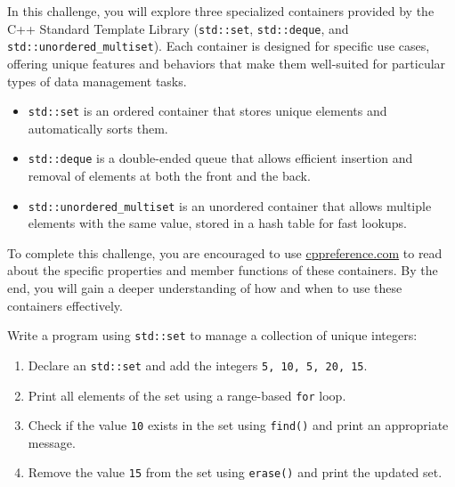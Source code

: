 \begin{challenge}
    \begin{chadescription}
    In this challenge, you will explore three specialized containers provided by the C++ Standard Template Library (\texttt{std::set}, \texttt{std::deque}, and \texttt{std::unordered\_multiset}). 
    Each container is designed for specific use cases, offering unique features and behaviors that make them well-suited for particular types of data management tasks.

    \begin{itemize}
        \item \texttt{std::set} is an ordered container that stores unique elements and automatically sorts them.
        \item \texttt{std::deque} is a double-ended queue that allows efficient insertion and removal of elements at both the front and the back.
        \item \texttt{std::unordered\_multiset} is an unordered container that allows multiple elements with the same value, stored in a hash table for fast lookups.
    \end{itemize}

    To complete this challenge, you are encouraged to use \href{https://en.cppreference.com/}{cppreference.com} to read about the specific properties and member functions of these containers. 
    By the end, you will gain a deeper understanding of how and when to use these containers effectively.
    \end{chadescription}

    \begin{task}
        Write a program using \texttt{std::set} to manage a collection of unique integers:
        \begin{enumerate}
            \item Declare an \texttt{std::set} and add the integers \texttt{5, 10, 5, 20, 15}.
            \item Print all elements of the set using a range-based \texttt{for} loop.
            \item Check if the value \texttt{10} exists in the set using \texttt{find()} and print an appropriate message.
            \item Remove the value \texttt{15} from the set using \texttt{erase()} and print the updated set.
        \end{enumerate}


\end{task}
\end{challenge}
